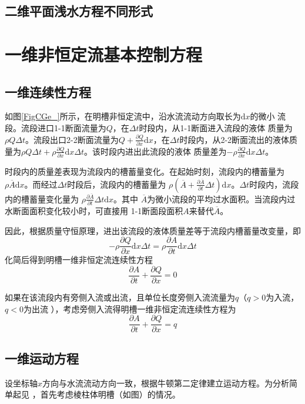 \subsection{二维平面浅水方程不同形式}

\section{一维非恒定流基本控制方程}
\subsection{一维连续性方程}
如图\ref{FigCGe_}所示，在明槽非恒定流中，沿水流流动方向取长为$\mathrm{d}x$的微小
流段。流段进口1-1断面流量为$Q$，在$\Delta t$时段内，从1-1断面进入流段的液体
质量为$\rho Q\Delta t$。流段出口2-2断面流量为$Q+\frac{\partial Q}{\partial
x}\mathrm{d}x$，在$\Delta t$时段内，从2-2断面流出的液体质量为$\rho Q\Delta
t+\rho\frac{\partial Q}{\partial x}\mathrm{d}x\Delta t$。该时段内进出此流段的液体
质量差为$-\rho\frac{\partial Q}{\partial x}\mathrm{d}x\Delta t$。

时段内的质量差表现为流段内的槽蓄量变化。在起始时刻，流段内的槽蓄量为
$\rho\overline{A}\mathrm{d}x$。而经过$\Delta t$时段后，流段内的槽蓄量为
$\rho\left(\overline{A}+\frac{\partial\overline{A}}{\partial t}\Delta
t\right)\mathrm{d}x$。$\Delta t$时段内，流段内的槽蓄量变化量为
$\rho\frac{\partial \overline{A}}{\partial t}\Delta t\mathrm{d}x$。其中
$\overline{A}$为微小流段的平均过水面积。当流段内过水断面面积变化较小时，可直接用
1-1断面段面积$A$来替代$\overline{A}$。

因此，根据质量守恒原理，进出该流段的液体质量差等于流段内槽蓄量改变量，即
\begin{equation*}
  -\rho\frac{\partial Q}{\partial x}\mathrm{d}x\Delta t
  =
  \rho\frac{\partial A}{\partial t}\mathrm{d}x\Delta t
\end{equation*}
化简后得到明槽一维非恒定流连续性方程
\begin{equation}
  \frac{\partial A}{\partial t}
  +
  \frac{\partial Q}{\partial x}
  =
  0
  \label{EqCGe_SVe_Ce}
\end{equation}

如果在该流段内有旁侧入流或出流，且单位长度旁侧入流流量为$q$（$q>0$为入流，$q<0$为出流
），考虑旁侧入流得明槽一维非恒定流连续性方程为
\begin{equation}
\frac{\partial A}{\partial t}
+
\frac{\partial Q}{\partial x}
=
q
\end{equation}

\subsection{一维运动方程}
设坐标轴$x$方向与水流流动方向一致，根据牛顿第二定律建立运动方程。为分析简单起见
，首先考虑棱柱体明槽（如图）的情况。

